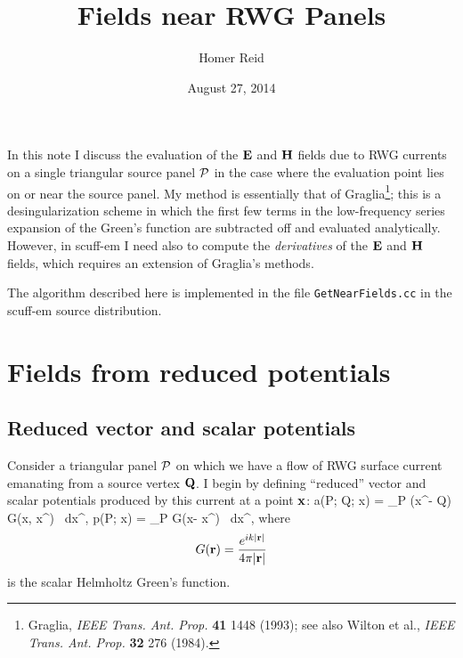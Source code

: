 \documentclass[letterpaper]{article}
\title {Fields near RWG Panels}
\author {Homer Reid}
\date {August 27, 2014}
\begin{document}
\pagestyle{myheadings}
\maketitle

In this note I discuss the evaluation of the
$\mathbf{E}$ and $\mathbf{H}$ fields due to RWG currents
on a single triangular source panel $\mathcal{P}$ in the case 
where the evaluation point lies on or near the source 
panel.
My method is essentially that of
Graglia\footnote{Graglia, \textit{IEEE Trans. Ant. Prop.} 
\textbf{41} 1448 (1993); see also 
Wilton et al., \textit{IEEE Trans. Ant. Prop.} \textbf{32} 
276 (1984).}; this is a desingularization scheme in which  
the first few terms in the low-frequency series expansion of the 
Green's function are subtracted off and evaluated analytically.
However, in {\sc scuff-em} I need also to compute the 
\textit{derivatives} of the $\mathbf{E}$ and $\mathbf{H}$ fields,
which requires an extension of Graglia's methods.

The algorithm described here is implemented in the 
file \texttt{GetNearFields.cc} in the {\sc scuff-em} source
distribution. 

\tableofcontents

\newpage
\section{Fields from reduced potentials} 

\subsection{Reduced vector and scalar potentials}

Consider a triangular panel $\mathcal{P}$ on which we have a flow of RWG
surface current emanating from a source vertex $\mathbf{Q}$. I begin by 
defining ``reduced'' vector and scalar potentials produced by this 
current at a point $\mathbf{x}$:
{ \vb a(\mc P; \vb Q; \vb x) =
   \int_{\mc P} (\vb x^\prime - \vb Q) G(\vb x, \vb x^\prime) \, d\vb x^\prime,
   \qquad
   p(\mc P; \vb x) = 
   \int_{\mc P} G(\vb x- \vb x^\prime) \, d\vb x^\prime,
}
where
$$ G(\mathbf{r})=\frac{e^{ik|\mathbf{r}|}}{4\pi |\mathbf{r}|} $$
is the scalar Helmholtz Green's function.
\end{document}
